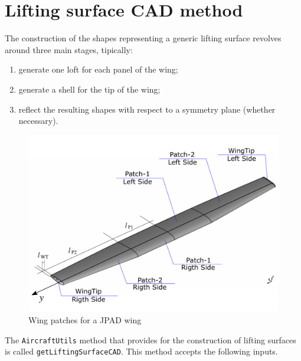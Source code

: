\section{Lifting surface CAD method}
\label{sec3.4}

The construction of the shapes representing a generic lifting surface revolves around three main stages, tipically:
%
\begin{enumerate}
\item generate one loft for each panel of the wing;
\item generate a shell for the tip of the wing;
\item reflect the resulting shapes with respect to a symmetry plane (whether necessary).
\end{enumerate}
%
\begin{figure}[H]
\centering
\includegraphics[scale=0.47]{Immagini/Capitolo3/wing_1}
\caption{Wing patches for a JPAD wing}
\label{fig:WingPatches}
\end{figure}
%
The \lstinline[language=Java]!AircraftUtils! method that provides for the construction of lifting surfaces is called \lstinline[language=Java]!getLiftingSurfaceCAD!. This method accepts the following inputs.
%
